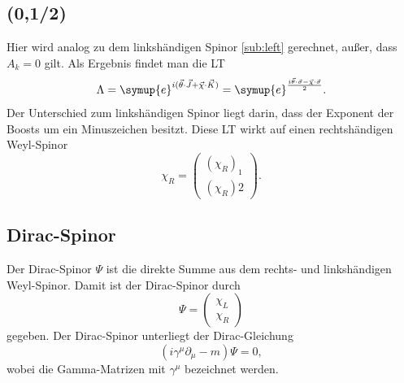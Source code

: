 \documentclass[
  captions=tableheading,  %
  titlepage=firstiscover, %
]{scrartcl}
\begin{document}
\subsection{(0,1/2)}
Hier wird analog zu dem linkshändigen Spinor \ref{sub:left} gerechnet, außer, dass $A_k = 0$ gilt. 
Als Ergebnis findet man die LT 
\begin{equation*}
  \Lambda  = \symup{e}^{i ( \vec{\theta} \cdot \vec{J} + \vec{\chi} \cdot \vec{K})} 
  = \symup{e}^{\frac{i\vec{\theta} \cdot \vec{\sigma} - \vec{\chi} \cdot \vec{\sigma}}{2}}.
\end{equation*}
Der Unterschied zum linkshändigen Spinor liegt darin, dass der Exponent der Boosts um ein Minuszeichen besitzt.
Diese LT wirkt auf einen rechtshändigen Weyl-Spinor  
\begin{equation*}
  \chi_R = 
  \begin{pmatrix}
  (\chi_R)_1 \\ (\chi_R)2  
  \end{pmatrix}.
\end{equation*}
\subsection{Dirac-Spinor}
Der Dirac-Spinor $\Psi$ ist die direkte Summe aus dem rechts- und linkshändigen Weyl-Spinor.
Damit ist der Dirac-Spinor durch 
\begin{equation*}
  \Psi = 
  \begin{pmatrix}
    \chi_L \\
    \chi_R
  \end{pmatrix}
\end{equation*}
gegeben.
Der Dirac-Spinor unterliegt der Dirac-Gleichung 
\begin{equation*}
  (i\gamma^{\mu}\partial_{\mu} - m)\Psi = 0,
\end{equation*}
wobei die Gamma-Matrizen mit $\gamma^{\mu}$ bezeichnet werden.
\end{document}
